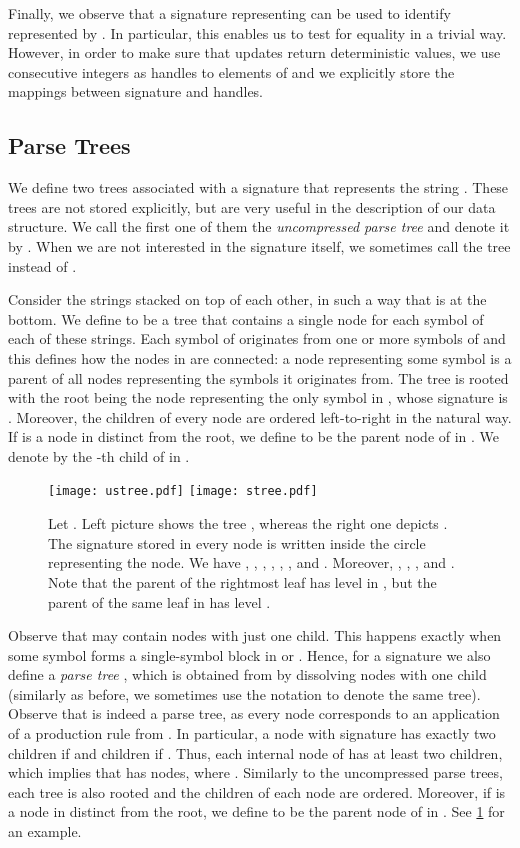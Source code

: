 \documentclass[a4paper]{article}
\theoremstyle{remark}
\begin{document}
Finally, we observe that a signature representing  can be used to identify  represented by .
In particular, this enables us to test for equality in a trivial way.
However, in order to make sure that updates return deterministic values, we use consecutive integers as handles to elements of 
and we explicitly store the mappings between signature and handles.

\subsection{Parse Trees}\label{sec:pt_overview}
We define two trees associated with a signature  that represents the string .
These trees are not stored explicitly, but are very useful in the description of our data structure.
We call the first one of them the \emph{uncompressed parse tree} and denote it by .
When we are not interested in the signature itself, we sometimes call the tree  instead of .

Consider the strings  stacked on top of each other, in such a way that  is at the bottom.
We define  to be a tree that contains a single node for each symbol of each of these strings.
Each symbol of  originates from one or more symbols of  and this defines how the nodes in  are connected: a node representing some symbol is a parent of all nodes representing the symbols it originates from.
The tree  is rooted with the root being the node representing the only symbol in ,
whose signature is .
Moreover, the children of every node are ordered left-to-right in the natural way.
If  is a node in  distinct from the root, we define  to be the parent node of  in .
We denote by  the -th child of  in .

\begin{figure}[ht]
\hspace{20pt}
\texttt{[image: ustree.pdf]}
\hfill
\texttt{[image: stree.pdf]}
\hspace{20pt}
\caption{Let . Left picture shows the tree , whereas the right one depicts .
The signature stored in every node is written inside the circle representing the node.
We have , , , , , , and .
Moreover, , , ,  and .
Note that the parent of the rightmost leaf has level  in , but the parent of the same leaf in  has level .
}
\label{fig:trees}
\end{figure}
 
Observe that  may contain nodes with just one child.
This happens exactly when some symbol forms a single-symbol block in  or .
Hence, for a signature  we also define a \emph{parse tree} , which is obtained from  by dissolving nodes with one child (similarly as before, we sometimes use the notation  to denote the same tree).
Observe that  is indeed a parse tree, as every node corresponds to an application of a production rule from .
In particular, a node  with signature  has exactly two children if  and  children if .
Thus, each internal node of  has at least two children, which implies that  has  nodes, where .
Similarly to the uncompressed parse trees, each tree  is also rooted and the children of each node are ordered.
Moreover, if  is a node in  distinct from the root, we define  to be the parent node of  in .
See \cref{fig:trees} for an example.
\end{document}
